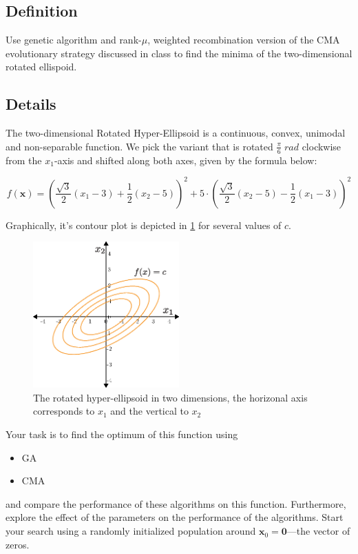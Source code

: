\documentclass[11pt]{article}
\begin{document}
\subsection{Definition}
\label{sec:orgffc7b03}
  Use genetic algorithm and rank-\(\mu\), weighted recombination version of the CMA
evolutionary strategy discussed in class to find the minima of the
two-dimensional rotated ellispoid.
\subsection{Details}
\label{sec:org58256b7}
The two-dimensional Rotated Hyper-Ellipsoid is a continuous, convex, unimodal
and non-separable function. We pick the variant that is rotated \(\frac{\pi}{6} \; \si{rad}\) clockwise from the \(x_1\)-axis and shifted along
both axes, given by the formula below:

\begin{equation}
f(\mathbf{x}) = \left( \dfrac{\sqrt{3}}{2} (x_1 - 3) + \dfrac{1}{2} (x_2 - 5) \right)^2 + 5 \cdot \left(  \dfrac{\sqrt{3}}{2} (x_2 - 5) - \dfrac{1}{2} (x_1 - 3)  \right)^2
\end{equation}


Graphically, it's contour plot is depicted in \cref{ellipsoid} for several
  values of \(c\).
\begin{figure}[htbp]
\centering
\includegraphics[width=0.5\textwidth]{images/ellipsoid.eps}
\caption{\label{ellipsoid}
The rotated hyper-ellipsoid in two dimensions, the horizonal axis corresponds to \(x_1\) and the vertical to \(x_2\)}
\end{figure}

Your task is to find the optimum of this function using
\begin{itemize}
\item GA
\item CMA
\end{itemize}
and compare the performance of these algorithms on this function. Furthermore,
explore the effect of the parameters on the performance of the algorithms.
Start your search using a randomly initialized population around \(\mathbf{x}_0 = \mathbf{0}\)---the vector of zeros.
\end{document}
